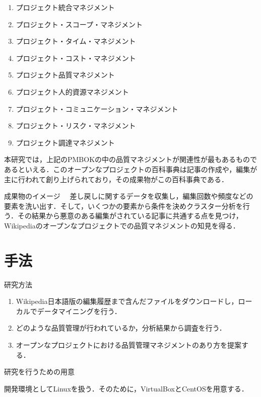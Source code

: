\begin{enumerate}
 \item プロジェクト統合マネジメント
 \item プロジェクト・スコープ・マネジメント
 \item プロジェクト・タイム・マネジメント
 \item プロジェクト・コスト・マネジメント
 \item プロジェクト品質マネジメント
 \item プロジェクト人的資源マネジメント
 \item プロジェクト・コミュニケーション・マネジメント
 \item プロジェクト・リスク・マネジメント
 \item プロジェクト調達マネジメント
\end{enumerate}








本研究では，上記のPMBOKの中の品質マネジメントが関連性が最もあるものであるといえる．このオープンなプロジェクトの百科事典は記事の作成や，編集が主に行われて創り上げられており，その成果物がこの百科事典である．


成果物のイメージ
　差し戻しに関するデータを収集し，編集回数や頻度などの要素を洗い出す．そして，いくつかの要素から条件を決めクラスター分析を行う．その結果から悪意のある編集がされている記事に共通する点を見つけ，Wikipediaのオープンなプロジェクトでの品質マネジメントの知見を得る．




\chapter{手法}

研究方法

\begin{enumerate}
 \item Wikipedia日本語版の編集履歴まで含んだファイルをダウンロードし，ローカルでデータマイニングを行う．
 \item どのような品質管理が行われているか，分析結果から調査を行う．
 \item オープンなプロジェクトにおける品質管理マネジメントのあり方を提案する．
\end{enumerate}

研究を行うための用意

開発環境としてLinuxを扱う．そのために，VirtualBoxとCentOSを用意する． 



